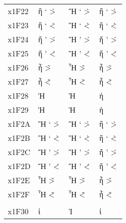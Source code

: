 \documentclass[a4paper]{article}
\newcommand*{\Greek}{\foreignlanguage{greek}}
\newcommand*{\Greek}{\ensuregreek}
\newcommand*{\Cases}[1]{%
  & \Greek{#1} & \Greek{\MakeUppercase{#1}} & \Greek{\MakeLowercase{#1}}
}
\begin{document}
\begin{longtable}{llll}
  x1F22 \Cases{ ἢ  \accpsilivaria{\eta}                         \>`{\eta}                   \`>{\eta}                  } \\
  x1F23 \Cases{ ἣ  \accdasiavaria{\eta}                         \<`{\eta}                   \`<{\eta}                  } \\
  x1F24 \Cases{ ἤ  \accpsilioxia{\eta}                          \>'{\eta}                   \'>{\eta}                  } \\
  x1F25 \Cases{ ἥ  \accdasiaoxia{\eta}                          \<'{\eta}                   \'<{\eta}                  } \\
  x1F26 \Cases{ ἦ  \accpsiliperispomeni{\eta}                   \~>{\eta}                   \>~{\eta}                  } \\
  x1F27 \Cases{ ἧ  \accdasiaperispomeni{\eta}                   \~<{\eta}                   \<~{\eta}                  } \\
  x1F28 \Cases{ Ἠ  \accpsili{\Eta}                              \>{\Eta}                                               } \\
  x1F29 \Cases{ Ἡ  \accdasia{\Eta}                              \<{\Eta}                                               } \\
  x1F2A \Cases{ Ἢ  \accpsilivaria{\Eta}                         \>`{\Eta}                   \`>{\Eta}                  } \\
  x1F2B \Cases{ Ἣ  \accdasiavaria{\Eta}                         \<`{\Eta}                   \`<{\Eta}                  } \\
  x1F2C \Cases{ Ἤ  \accpsilioxia{\Eta}                          \>'{\Eta}                   \'>{\Eta}                  } \\
  x1F2D \Cases{ Ἥ  \accdasiaoxia{\Eta}                          \<'{\Eta}                   \'<{\Eta}                  } \\
  x1F2E \Cases{ Ἦ  \accpsiliperispomeni{\Eta}                   \~>{\Eta}                   \>~{\Eta}                  } \\
  x1F2F \Cases{ Ἧ  \accdasiaperispomeni{\Eta}                   \~<{\Eta}                   \<~{\Eta}                  } \\
                                                                                                                         \\
  x1F30 \Cases{ ἰ  \accpsili{\iota}                             \>{\iota}                                              } \\

\end{longtable}
\end{document}
